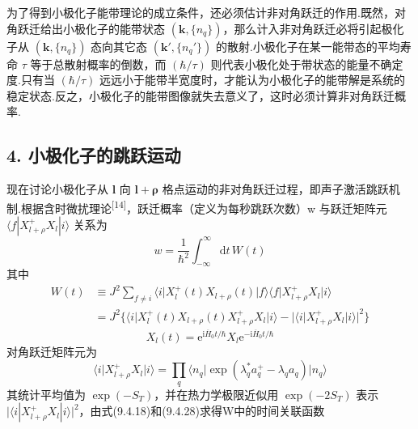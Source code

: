 为了得到小极化子能带理论的成立条件，还必须估计非对角跃迁的作用.既然，对角跃迁给出小极化子的能带状态 $\left(\boldsymbol{k},\{n_{q}\}\right)$，那么计入非对角跃迁必将引起极化子从 $\left(\boldsymbol{k},\{n_{q}\}\right)$ 态向其它态 $\left(\boldsymbol{k}',\{n_{q}'\}\right)$ 的散射.小极化子在某一能带态的平均寿命 $\tau$ 等于总散射概率的倒数，而 $\left(\hbar/\tau\right)$ 则代表小极化处于带状态的能量不确定度.只有当 $\left(\hbar/\tau\right)$ 远远小于能带半宽度时，才能认为小极化子的能带解是系统的稳定状态.反之，小极化子的能带图像就失去意义了，这时必须计算非对角跃迁概率.

\subsection*{4. 小极化子的跳跃运动}

现在讨论小极化子从 $\boldsymbol{l}$ 向 $\boldsymbol{l}+\boldsymbol{\rho}$ 格点运动的非对角跃迁过程，即声子激活跳跃机制.根据含时微扰理论\textsuperscript{[14]}，跃迁概率（定义为每秒跳跃次数）w 与跃迁矩阵元
$\langle f|X_{l+\rho}^{+}X_{l}|i\rangle$ 关系为
\begin{equation}
  w=\frac{1}{\hbar^{2}}\int_{-\infty}^{\infty}\mathrm{d}t\,W(t)
\end{equation}
其中
\begin{equation}
\begin{aligned}
  W(t)&\equiv J^{2}\sum_{f\neq i}
  \bigl\langle i\bigl|X_{l}^{+}(t)X_{l+\rho}(t)\bigr|f\bigr\rangle
  \bigl\langle f\bigl|X_{l+\rho}^{+}X_{l}\bigr|i\bigr\rangle\\
  &=J^{2}\bigl\{\bigl\langle i\bigl|X_{l}^{+}(t)X_{l+\rho}(t)
  X_{l+\rho}^{+}X_{l}\bigr|i\bigr\rangle
  -\bigl|\bigl\langle i\bigl|X_{l+\rho}^{+}X_{l}\bigr|i\bigr\rangle\bigr|^{2}\bigr\}
\end{aligned}
\end{equation}
\begin{equation}
  X_{l}(t)=\mathrm{e}^{\mathrm{i}\overline{H}_{0}t/\hbar}X_{l}
  \mathrm{e}^{-\mathrm{i}\overline{H}_{0}t/\hbar}
\end{equation}
对角跃迁矩阵元为
\begin{equation}
  \bigl\langle i\bigl|X_{l+\rho}^{+}X_{l}\bigr|i\bigr\rangle
  =\prod_{q}\bigl\langle n_{q}\bigl|\exp(\lambda_{q}^{*}a_{q}^{+}
  -\lambda_{q}a_{q})\bigr|n_{q}\bigr\rangle
\end{equation}
其统计平均值为 $\exp\left(-S_{T}\right)$，并在热力学极限近似用 $\exp\left(-2S_{T}\right)$ 表示
$\bigl|\langle i|X_{l+\rho}^{+}X_{l}|i\rangle\bigr|^{2}$，由式(9.4.18)和(9.4.28)求得W中的时间关联函数
